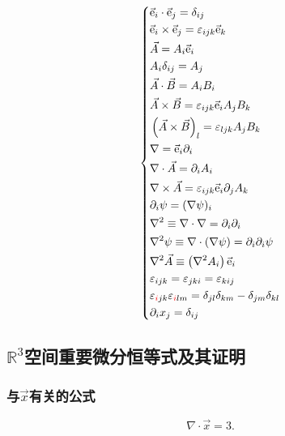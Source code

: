 \begin{equation}
\left\{
\begin{aligned}
&\vec{\mathrm{e}}_i\cdot\vec{\mathrm{e}}_j=\delta_{ij} \\
&\vec{\mathrm{e}}_i\times\vec{\mathrm{e}}_j=\varepsilon_{ijk}\vec{\mathrm{e}}_k \\
&\vec{A} = A_i\vec{\mathrm{e}}_i \\
&A_{i}\delta_{ij}=A_j \\
&\vec{A}\cdot\vec{B}=A_i B_i \\
&\vec{A}\times\vec{B}=\varepsilon_{ijk}\vec{\mathrm{e}}_i A_j B_k \\
&\left(\vec{A}\times\vec{B}\right)_l = \varepsilon_{ljk} A_j B_k \\
&\nabla = \vec{\mathrm{e}}_i\partial_i \\
&\nabla\cdot\vec{A}=\partial_i A_i \\
&\nabla\times\vec{A} = \varepsilon_{ijk} \vec{\mathrm{e}}_i \partial_j A_k \\
&\partial_i \psi = (\nabla\psi)_i \\
&\nabla^2 \equiv \nabla\cdot \nabla = \partial_i \partial_i \\
&\nabla^2\psi\equiv \nabla\cdot(\nabla\psi)=\partial_i\partial_i \psi \\
&\nabla^2\vec{A}\equiv \left(\nabla^2 A_i\right)\vec{\mathrm{e}}_i \\
&\varepsilon_{ijk} = \varepsilon_{jki} = \varepsilon_{kij} \\
&\varepsilon_{\textcolor{red}{i}jk}\varepsilon_{\textcolor{red}{i}lm} = \delta_{jl}\delta_{km} - \delta_{jm}\delta_{kl} \\
&\partial_i x_j = \delta_{ij}
\end{aligned}
\right.
\end{equation}

\subsection{\texorpdfstring{$\mathbb{R}^3 $空间重要微分恒等式及其证明}{R3空间重要微分恒等式及其证明}}

\subsubsection{\texorpdfstring{与$\vec{x}$有关的公式}{与x有关的公式}}

\begin{example}
\begin{equation}
\nabla\cdot\vec{x}
=3.
\end{equation}
\end{example}

